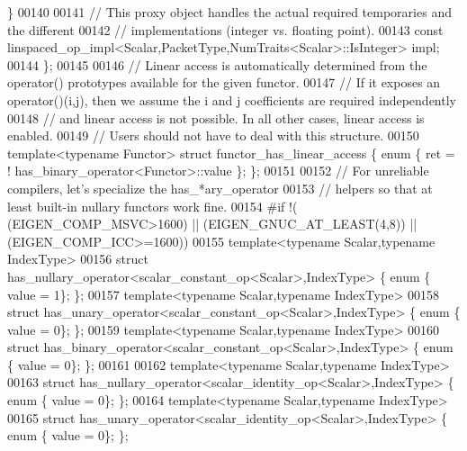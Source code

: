 \begin{DoxyCode}
       \}
00140 
00141   \textcolor{comment}{// This proxy object handles the actual required temporaries and the different}
00142   \textcolor{comment}{// implementations (integer vs. floating point).}
00143   \textcolor{keyword}{const} linspaced\_op\_impl<Scalar,PacketType,NumTraits<Scalar>::IsInteger> impl;
00144 \};
00145 
00146 \textcolor{comment}{// Linear access is automatically determined from the operator() prototypes available for the given
       functor.}
00147 \textcolor{comment}{// If it exposes an operator()(i,j), then we assume the i and j coefficients are required independently}
00148 \textcolor{comment}{// and linear access is not possible. In all other cases, linear access is enabled.}
00149 \textcolor{comment}{// Users should not have to deal with this structure.}
00150 \textcolor{keyword}{template}<\textcolor{keyword}{typename} Functor> \textcolor{keyword}{struct }functor\_has\_linear\_access \{ \textcolor{keyword}{enum} \{ ret = !
      has\_binary\_operator<Functor>::value \}; \};
00151 
00152 \textcolor{comment}{// For unreliable compilers, let's specialize the has\_*ary\_operator}
00153 \textcolor{comment}{// helpers so that at least built-in nullary functors work fine.}
00154 \textcolor{preprocessor}{#if !( (EIGEN\_COMP\_MSVC>1600) || (EIGEN\_GNUC\_AT\_LEAST(4,8)) || (EIGEN\_COMP\_ICC>=1600))}
00155 \textcolor{keyword}{template}<\textcolor{keyword}{typename} Scalar,\textcolor{keyword}{typename} IndexType>
00156 \textcolor{keyword}{struct }has\_nullary\_operator<scalar\_constant\_op<Scalar>,IndexType> \{ \textcolor{keyword}{enum} \{ value = 1\}; \};
00157 \textcolor{keyword}{template}<\textcolor{keyword}{typename} Scalar,\textcolor{keyword}{typename} IndexType>
00158 \textcolor{keyword}{struct }has\_unary\_operator<scalar\_constant\_op<Scalar>,IndexType> \{ \textcolor{keyword}{enum} \{ value = 0\}; \};
00159 \textcolor{keyword}{template}<\textcolor{keyword}{typename} Scalar,\textcolor{keyword}{typename} IndexType>
00160 \textcolor{keyword}{struct }has\_binary\_operator<scalar\_constant\_op<Scalar>,IndexType> \{ \textcolor{keyword}{enum} \{ value = 0\}; \};
00161 
00162 \textcolor{keyword}{template}<\textcolor{keyword}{typename} Scalar,\textcolor{keyword}{typename} IndexType>
00163 \textcolor{keyword}{struct }has\_nullary\_operator<scalar\_identity\_op<Scalar>,IndexType> \{ \textcolor{keyword}{enum} \{ value = 0\}; \};
00164 \textcolor{keyword}{template}<\textcolor{keyword}{typename} Scalar,\textcolor{keyword}{typename} IndexType>
00165 \textcolor{keyword}{struct }has\_unary\_operator<scalar\_identity\_op<Scalar>,IndexType> \{ \textcolor{keyword}{enum} \{ value = 0\}; \};

\end{DoxyCode}
